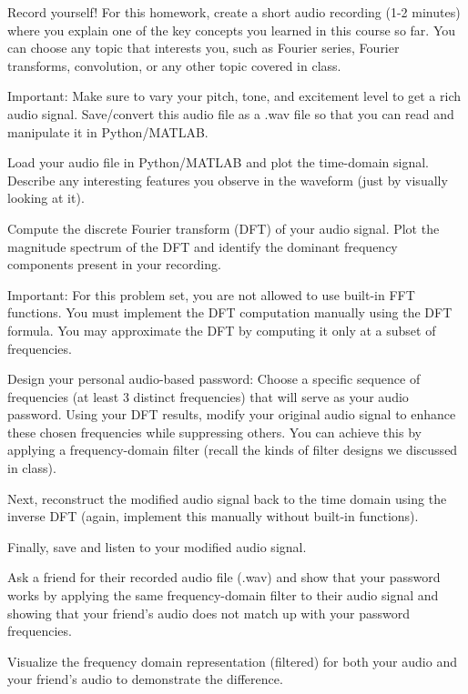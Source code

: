 \documentclass{ee102_pset}
\author{\rule{3cm}{0.4pt}} %
\begin{document}

Record yourself! For this homework, create a short audio recording (1-2 minutes) where you explain one of the key concepts you learned in this course so far. You can choose any topic that interests you, such as Fourier series, Fourier transforms, convolution, or any other topic covered in class. 

Important: Make sure to vary your pitch, tone, and excitement level to get a rich audio signal. Save/convert this audio file as a .wav file so that you can read and manipulate it in Python/MATLAB.

\problempart [10 points]
Load your audio file in Python/MATLAB and plot the time-domain signal. Describe any interesting features you observe in the waveform (just by visually looking at it).

\problempart [40 points]
Compute the discrete Fourier transform (DFT) of your audio signal. Plot the magnitude spectrum of the DFT and identify the dominant frequency components present in your recording. 

Important: For this problem set, you are not allowed to use built-in FFT functions. You must implement the DFT computation manually using the DFT formula. You may approximate the DFT by computing it only at a subset of frequencies.

\problempart [30 points]
Design your personal audio-based password: Choose a specific sequence of frequencies (at least 3 distinct frequencies) that will serve as your audio password. Using your DFT results, modify your original audio signal to enhance these chosen frequencies while suppressing others. You can achieve this by applying a frequency-domain filter (recall the kinds of filter designs we discussed in class).

Next, reconstruct the modified audio signal back to the time domain using the inverse DFT (again, implement this manually without built-in functions). 

Finally, save and listen to your modified audio signal. 

\problempart [20 points] Ask a friend for their recorded audio file (.wav) and show that your password works by applying the same frequency-domain filter to their audio signal and showing that your friend's audio does not match up with your password frequencies.

Visualize the frequency domain representation (filtered) for both your audio and your friend's audio to demonstrate the difference.
\end{document}
